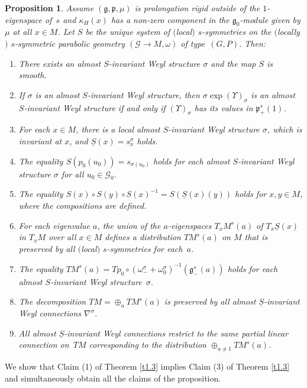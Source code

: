 \documentclass[10pt,a4paper]{amsart}
\newcommand{\om}{\omega}
\newcommand{\si}{\sigma}
\newcommand{\un}{\underline}
\newcommand{\ba}{\mathcal{G}}
\newcommand{\fg}{\mathfrak g}
\newcommand{\fp}{\mathfrak p}
\newcommand{\U}{\Upsilon}
\numberwithin{equation}{section}
\newtheorem{Proposition}[Theorem]{Proposition}
 { \theoremstyle{definition}
\newtheorem{Definition}[Theorem]{Definition}
\newtheorem{Example}[Theorem]{Example}
\newtheorem{Remark}[Theorem]{Remark} }
\begin{document}
\begin{Proposition} \label{almost-ws}
Assume $(\fg,\fp,\mu)$ is prolongation rigid outside of the $1$-eigenspace of~$s$ and $\kappa_H(x)$ has a non-zero component in the $\fg_0$-module given by $\mu$ at all $x\in M$. Let $S$ be the unique system of $($local$)$ $s$-symmetries on the $($locally$)$ $s$-symmetric parabolic geometry $(\ba\to M,\om)$ of type~$(G,P)$. Then:
\begin{enumerate}\itemsep=0pt
\item[$1.$] There exists an almost $S$-invariant Weyl structure $\si$ and the map $S$ is smooth.
\item[$2.$] If $\si$ is an almost $S$-invariant Weyl structure, then $\si\exp(\U)_\si$ is an almost $S$-invariant Weyl structure if and only if $(\U)_\si$ has its values in $\fp^s_+(1)$.
\item[$3.$] For each $x\in M$, there is a local almost $S$-invariant Weyl structure $\si$, which is invariant at $x$, and $\un S(x)=s_x^{\si}$ holds.
\item[$4.$] The equality $S(p_0(u_0))=s_{\si(u_0)}$ holds for each almost $S$-invariant Weyl structure $\si$ for all $u_0\in \ba_0$.
\item[$5.$] The equality $S(x)\circ S(y)\circ S(x)^{-1}=S(\un S(x)(y))$ holds for $x,y\in M$, where the compositions are defined.
\item[$6.$] For each eigenvalue $a$, the union of the $a$-eigenspaces $T_xM^s(a)$ of $T_x\un S(x)$ in $T_xM$ over all $x\in M$ defines a distribution $TM^s(a)$ on $M$ that is preserved by all $($local$)$ $s$-symmetries for each~$a$.
\item[$7.$] The equality $TM^s(a)=Tp_0\circ (\om^\si_-+\om^\si_0)^{-1}(\fg_-^s(a))$ holds for each almost $S$-invariant Weyl structure~$\si$.
\item[$8.$] The decomposition $TM=\oplus_a TM^s(a)$ is preserved by all almost $\un S$-inva\-riant Weyl connections $\nabla^\si$.
\item[$9.$] All almost $\un S$-invariant Weyl connections restrict to the same partial linear connection on~$TM$ corresponding to the distribution $\oplus_{a\neq 1} TM^s(a)$.
\end{enumerate}
\end{Proposition}
We show that Claim (1) of Theorem \ref{t1.3} implies Claim (3) of Theorem \ref{t1.3} and simultaneously obtain all the claims of the proposition.
\end{document}
